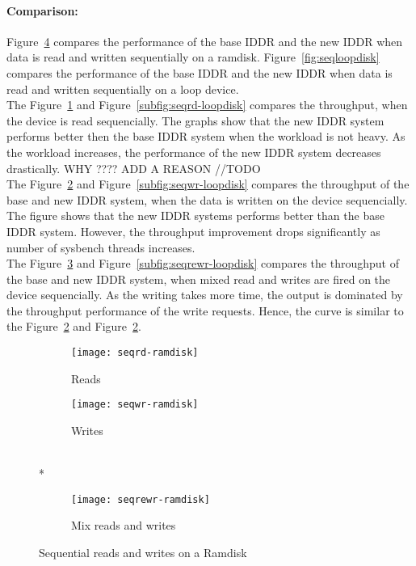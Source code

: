 \paragraph{Comparison:}
Figure~\ref{fig:seqramdisk} compares the performance of the base IDDR and the new IDDR when data is read and written sequentially on a ramdisk. Figure~\ref{fig:seqloopdisk} compares the performance of the base IDDR and the new IDDR when data is read and written sequentially on a loop device.
\\[3mm]
The Figure~\ref{subfig:seqrd-ramdisk} and Figure~\ref{subfig:seqrd-loopdisk} compares the throughput, when the device is read sequencially. The graphs show that the new IDDR system performs better then the base IDDR system when the workload is not heavy. As the workload increases, the performance of the new IDDR system decreases drastically. WHY ???? ADD A REASON //TODO
\\[3mm]
The Figure~\ref{subfig:seqwr-ramdisk} and Figure~\ref{subfig:seqwr-loopdisk} compares the throughput of the base and new IDDR system, when the data is written on the device sequencially. The figure shows that the new IDDR systems performs better than the base IDDR system. However, the throughput improvement drops significantly as number of sysbench threads increases.
\\[3mm]
The Figure~\ref{subfig:seqrewr-ramdisk} and Figure~\ref{subfig:seqrewr-loopdisk} compares the throughput of the base and new IDDR system, when mixed read and writes are fired on the device sequencially. As the writing takes more time, the output is dominated by the throughput performance of the write requests. Hence, the curve is similar to the Figure~\ref{subfig:seqwr-ramdisk} and Figure~\ref{subfig:seqwr-ramdisk}. 

\begin{figure}[!ht]
  \begin{subfigure}[b]{0.2\textwidth}
  \texttt{[image: seqrd-ramdisk]}
  \caption{Reads}
  \label{subfig:seqrd-ramdisk}
  \end{subfigure}
  \hspace{50mm}
  \begin{subfigure}[b]{0.2\textwidth}
  \texttt{[image: seqwr-ramdisk]}
  \caption{Writes}
  \label{subfig:seqwr-ramdisk}
  \end{subfigure}\\*
  \hspace{150mm}
  \begin{subfigure}[b]{0.3\textwidth}
  \texttt{[image: seqrewr-ramdisk]}
  \caption{Mix reads and writes}
  \label{subfig:seqrewr-ramdisk}
  \end{subfigure}
  \caption{Sequential reads and writes on a Ramdisk}\label{fig:seqramdisk}
\end{figure}

